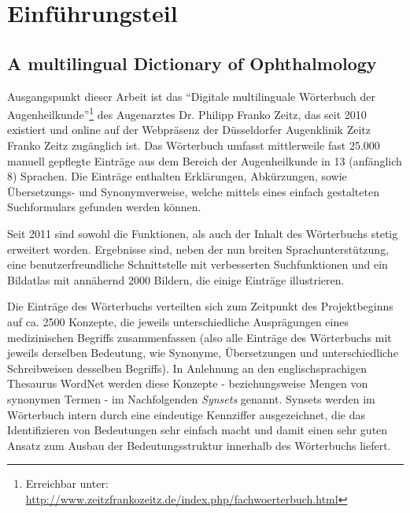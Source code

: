 \documentclass[pagesize,DIV=calc,12pt,final]{scrreprt}
\begin{document}

\tableofcontents

\chapter{Einführungsteil}

\section{A multilingual Dictionary of Ophthalmology}

Ausgangspunkt dieser Arbeit ist das \enquote{Digitale multilinguale Wörterbuch der Augenheilkunde}\footnote{Erreichbar unter: \href{http://www.zeitzfrankozeitz.de/index.php/fachwoerterbuch.html}{http://www.zeitzfrankozeitz.de/index.php/fachwoerterbuch.html}} des Augenarztes Dr. Philipp Franko Zeitz, das seit 2010 existiert und online auf der Webpräsenz der Düsseldorfer Augenklinik Zeitz Franko Zeitz zugänglich ist. 
Das Wörterbuch umfasst mittlerweile fast 25.000 manuell gepflegte Einträge aus dem Bereich der Augenheilkunde in 13 (anfänglich 8) Sprachen. 
Die Einträge enthalten Erklärungen, Abkürzungen, sowie Übersetzungs- und Synonymverweise, welche mittels eines einfach gestalteten Suchformulars gefunden werden können. 

Seit 2011 sind sowohl die Funktionen, als auch der Inhalt des Wörterbuchs stetig erweitert worden.
Ergebnisse sind, neben der nun breiten Sprachunterstützung, eine benutzerfreundliche Schnittstelle mit verbesserten Suchfunktionen und ein Bildatlas mit annähernd 2000 Bildern, die einige Einträge illustrieren. 

Die Einträge des Wörterbuchs verteilten sich zum Zeitpunkt des Projektbeginns auf ca. 2500 Konzepte, die jeweils unterschiedliche Ausprägungen eines medizinischen Begriffs zusammenfassen (also alle Einträge des Wörterbuchs mit jeweils derselben Bedeutung, wie Synonyme, Übersetzungen und unterschiedliche Schreibweisen desselben Begriffs). 
In Anlehnung an den englischsprachigen Thesaurus WordNet werden diese Konzepte - beziehungsweise Mengen von synonymen Termen - im Nachfolgenden \emph{Synsets} genannt. 
Synsets werden im Wörterbuch intern durch eine eindeutige Kennziffer ausgezeichnet, die das Identifizieren von Bedeutungen sehr einfach macht und damit einen sehr guten Ansatz zum Ausbau der Bedeutungsstruktur innerhalb des Wörterbuchs liefert.
\end{document}
